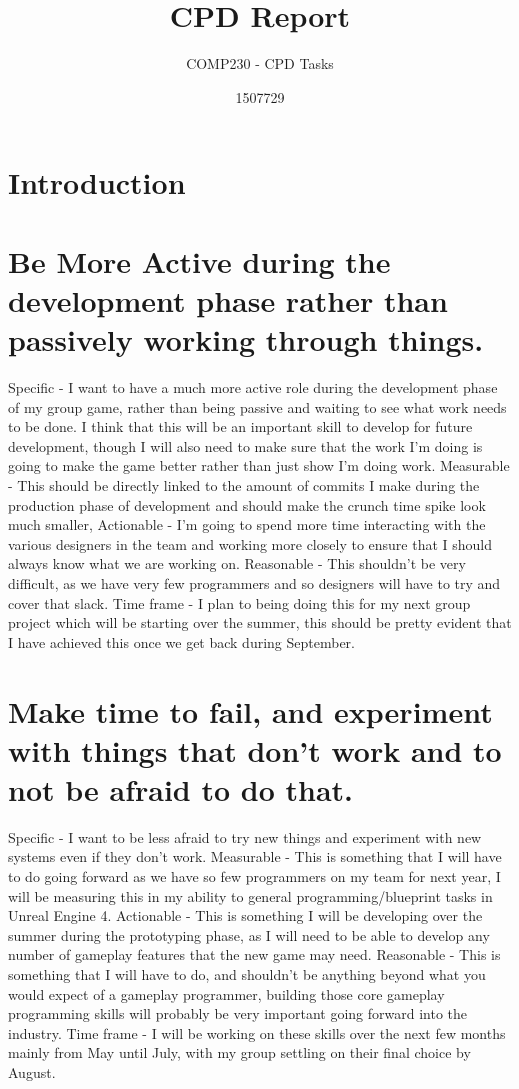 \documentclass{scrartcl}
\title{CPD Report}
\subtitle{COMP230 - CPD Tasks}
\author{1507729}
\begin{document}
\maketitle

\section*{Introduction}


\section{Be More Active during the development phase rather than passively working through things.}

Specific - I want to have a much more active role during the development phase of my group game, rather than being passive and waiting to see what work needs to be done. I think that this will be an important skill to develop for future development, though I will also need to make sure that the work I'm doing is going to make the game better rather than just show I'm doing work.
Measurable - This should be directly linked to the amount of commits I make during the production phase of development and should make the crunch time spike look much smaller,
Actionable - I'm going to spend more time interacting with the various designers in the team and working more closely to ensure that I should always know what we are working on.
Reasonable - This shouldn't be very difficult, as we have very few programmers and so designers will have to try and cover that slack.
Time frame - I plan to being doing this for my next group project which will be starting over the summer, this should be pretty evident that I have achieved this once we get back during September.

\section{Make time to fail, and experiment with things that don't work and to not be afraid to do that.}

Specific - I want to be less afraid to try new things and experiment with new systems even if they don't work.
Measurable - This is something that I will have to do going forward as we have so few programmers on my team for next year, I will be measuring this in my ability to general programming/blueprint tasks in Unreal Engine 4. 
Actionable - This is something I will be developing over the summer during the prototyping phase, as I will need to be able to develop any number of gameplay features that the new game may need.
Reasonable - This is something that I will have to do, and shouldn't be anything beyond what you would expect of a gameplay programmer, building those core gameplay programming skills will probably be very important going forward into the industry.
Time frame - I will be working on these skills over the next few months mainly from May until July, with my group settling on their final choice by August.
\end{document}

